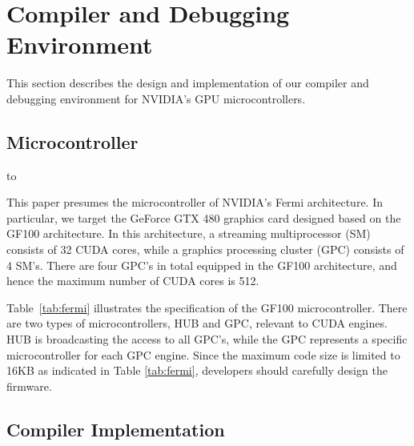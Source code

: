 
\section{Compiler and Debugging Environment}\label{sec:design}

This section describes the design and implementation of our compiler and
debugging environment for NVIDIA's GPU microcontrollers.

\subsection{Microcontroller}

\begin{table}[!t]
\caption{Specification of GF100 microcontroller.} 
\label{tab:fermi}
\hbox to
\end{table}

This paper presumes the microcontroller of NVIDIA's Fermi architecture.
In particular, we target the GeForce GTX 480 graphics card designed
based on the GF100 architecture.
In this architecture, a streaming multiprocessor (SM) consists of
32 CUDA cores, while a graphics processing cluster (GPC) consists of 4
SM's.
There are four GPC's in total equipped in the GF100 architecture, and
hence the maximum number of CUDA cores is 512.

Table~\ref{tab:fermi} illustrates the specification of the GF100
microcontroller.
There are two types of microcontrollers, HUB and GPC, relevant to CUDA
engines.
HUB is broadcasting the access to all GPC's, while the GPC represents a
specific microcontroller for each GPC engine.
Since the maximum code size is limited to 16KB as indicated in Table
\ref{tab:fermi}, developers should carefully design the firmware.

\subsection{Compiler Implementation}


